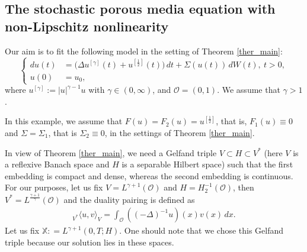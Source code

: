 \documentclass[english,a4paper,11pt]{amsart}
\theoremstyle{plain}
\theoremstyle{definition}
\theoremstyle{remark}
\numberwithin{equation}{section}
\newcommand{\Ocal} {{\mathcal O}}
\newcommand{\X}{\mathbb{X}}
\begin{document}
\subsection{The stochastic porous media equation with non-Lipschitz nonlinearity}\label{Example2}
Our aim is to fit the following model in the setting of Theorem \ref{ther_main}:
\begin{equation}\label{E2}
	\left\{
	\begin{aligned}
		du(t)&= \big(\Delta u^{[\gamma]}(t)+u^{[\frac{1}{2}]}(t)\big)\, d t+ \Sigma(u(t))\, dW(t),\ t>0, \\
		u(0)&=u_0,
	\end{aligned}
	\right.
\end{equation}where $u^{[\gamma]}:=|u|^{\gamma-1}u$ with $\gamma\in (0,\infty)$, and $\Ocal=(0,1)$. We assume that $\gamma> 1$.

In this example, we assume that $F(u)=F_2(u)=u^{[\frac{1}{2}]}$, that is, $F_1(u)\equiv 0$ and $\Sigma=\Sigma_1$, that is $\Sigma_2\equiv 0$, in the settings of Theorem \ref{ther_main}.

In view of Theorem \ref{ther_main}, we need a Gelfand triple $V\subset H \subset V^\ast$ (here $V$ is a reflexive Banach space  and $H$ is a separable Hilbert space) such that the first embedding is compact and dense, whereas the second embedding is continuous.  For our purposes, let us fix $V=L^{\gamma+1}(\Ocal)$ and $H=H_2^{-1}(\Ocal)$, then $V^\ast = L^{\frac{\gamma+1}{\gamma}}(\Ocal)$
and  the duality pairing is defined as 
\begin{align*}
	_{V^\ast}\langle u,v\rangle_{V}=\int_{\Ocal}((-\Delta)^{-1}u)(x)v(x)\, d x.
\end{align*} Let us fix $\X: =L^{\gamma+1}(0,T;H)$. One should note that we chose this Gelfand triple because our solution lies in these spaces. 
\end{document}
